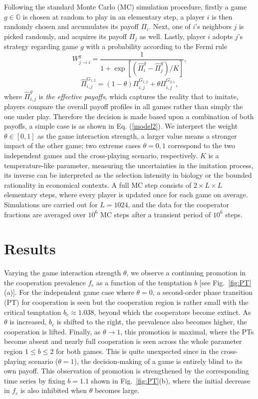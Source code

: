 \documentclass[doublecol]{epl2}
\begin{document}
Following the standard Monte Carlo (MC) simulation procedure, firstly a game $g\in \mathbb{G}$ is chosen at random to play in an elementary step, a player $i$ is then randomly chosen and accumulates its payoff $\Pi_i$. Next, one of $i$'s neighbors $j$ is picked randomly, and acquires its payoff $\Pi_j$ as well. Lastly, player $i$ adopts $j$'s strategy regarding game $g$ with a probability according to the Fermi rule~\cite{szabo1998evolutionary}
\begin{equation}
W^g_{j\rightarrow i}=\frac{1}{1+\exp[(\widehat{\Pi}_i^g-\widehat{\Pi}_j^g)/K]} ,
\label{model1}
\end{equation}
\begin{equation}
\widehat{\Pi}_{i,j}^{G_{1,2}}=(1-\theta)\Pi_{i,j}^{G_{1,2}}+\theta \Pi_{i,j}^{G_{2,1}},
\label{model2}
\end{equation}
where $\widehat{\Pi}_{i,j}^g$ is \emph{the effective payoffs}, which captures the reality that to imitate, players compare the overall payoff profiles in all games rather than simply the one under play. Therefore the decision is made based upon a combination of both payoffs, a simple case is as shown in Eq. (\ref{model2}). We interpret the weight $\theta\in[0,1]$ as the game interaction strength, a larger value means a stronger impact of the other game; two extreme cases $\theta=0,1$ correspond to the two independent games and the cross-playing scenario, respectively. $K$ is a temperature-like parameter, measuring the uncertainties in the imitation process, its inverse can be interpreted as the selection intensity in biology or the bounded rationality in economical contexts. A full MC step consists of $2\!\times\!L\!\times\!L$ elementary steps, where every player is updated once for each game on average. Simulations are carried out for $L=1024$, and the data for the cooperator fractions are averaged over $10^6$ MC steps after a transient period of $10^6$ steps. 

\section{Results}
Varying the game interaction strength $\theta$, we observe a continuing promotion in the cooperation prevalence $f_c$ as a function of the temptation $b$ [see Fig.~\ref{fig:PT}(a)]. For the independent game case where $\theta=0$, a second-order phase transition (PT) for cooperation is seen but the cooperation region is rather small with the critical temptation $b_c\approx1.038$, beyond which the cooperators become extinct. As $\theta$ is increased, $b_c$ is shifted to the right, the prevalence also becomes higher, the cooperation is lifted. Finally, as $\theta\rightarrow 1$, this promotion is maximal, where the PTs become absent and nearly full cooperation is seen across the whole parameter region $1\leq b \leq2$ for both games. This is quite unexpected since in the cross-playing scenario ($\theta=1$), the decision-making of a game is entirely blind to its own payoff. This observation of promotion is strengthened by the corresponding time series by fixing $b=1.1$ shown in Fig.~\ref{fig:PT}(b), where the initial decrease in $f_c$ is also inhibited when $\theta$ becomes large.
\end{document}
